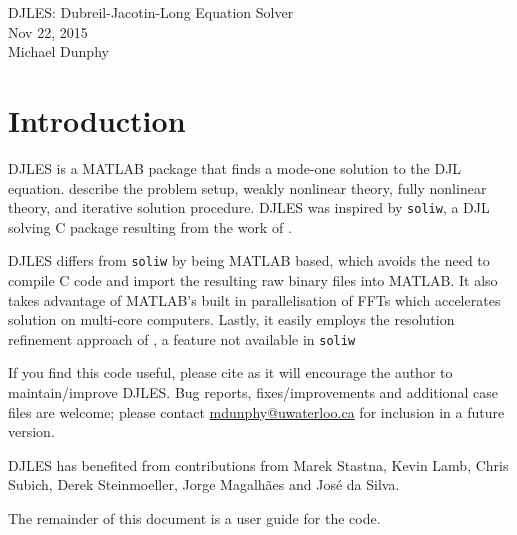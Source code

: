 \documentclass[letterpaper]{article}
\begin{document}
\newpage
\pagestyle{plain}
\setcounter{page}{1}

\begin{center}
\huge{DJLES: Dubreil-Jacotin-Long Equation Solver}\\[1em]
\large{Nov 22, 2015}\\
Michael Dunphy
\end{center}

\section{Introduction}
DJLES is a MATLAB package that finds a mode-one solution to the DJL equation. \cite{StastnaLamb2002} describe the problem setup, weakly nonlinear theory, fully nonlinear theory, and iterative solution procedure. DJLES was inspired by \verb+soliw+, a DJL solving C package resulting from the work of \cite{StastnaLamb2002}.

DJLES differs from \verb+soliw+ by being MATLAB based, which avoids the need to compile C code and import the resulting raw binary files into MATLAB. It also takes advantage of MATLAB's built in parallelisation of FFTs which accelerates solution on multi-core computers. Lastly, it easily employs the resolution refinement approach of \cite{DunphySubichStastna2011}, a feature not available in \verb+soliw+

If you find this code useful, please cite \cite{DunphySubichStastna2011} as it will encourage the author to maintain/improve DJLES. Bug reports, fixes/improvements and additional case files are welcome; please contact \href{mailto:mdunphy@uwaterloo.ca}{mdunphy@uwaterloo.ca} for inclusion in a future version.

DJLES has benefited from contributions from Marek Stastna, Kevin Lamb, Chris Subich, Derek Steinmoeller, Jorge Magalh\~aes and Jos\'e da Silva.

The remainder of this document is a user guide for the code.
\end{document}
